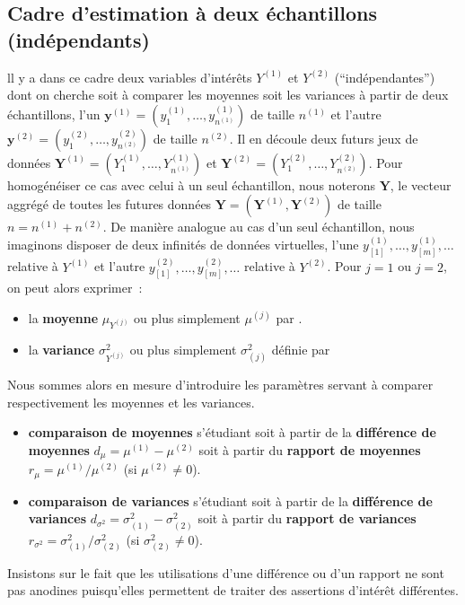 \documentclass[10pt]{article}
\begin{document}
\subsection{Cadre d'estimation {\`a} deux {\'e}chantillons (ind{\'e}pendants)}
ll y a dans ce cadre deux variables d'int{\'e}r{\^e}ts $Y^{(1)}$ et $Y^{(2)}$ (``ind{\'e}pendantes'') dont on cherche soit {\`a} comparer les moyennes soit les variances {\`a} partir de deux {\'e}chantillons, l'un $\mathbf{y}^{(1)}=(y_1^{(1)},\ldots,y_{n^{(1)}}^{(1)})$ de taille $n^{(1)}$ et  l'autre $\mathbf{y}^{(2)}=(y_1^{(2)},\ldots,y_{n^{(2)}}^{(2)})$ de taille $n^{(2)}$. Il en d{\'e}coule deux futurs jeux de donn{\'e}es  $\mathbf{Y}^{(1)}=(Y_1^{(1)},\ldots,Y_{n^{(1)}}^{(1)})$ et $\mathbf{Y}^{(2)}=(Y_1^{(2)},\ldots,Y_{n^{(2)}}^{(2)})$. Pour homog{\'e}n{\'e}iser ce cas avec celui {\`a} un seul {\'e}chantillon, nous noterons $\mathbf{Y}$, le vecteur aggr{\'e}g{\'e} de toutes les futures donn{\'e}es $\mathbf{Y}=(\mathbf{Y}^{(1)},\mathbf{Y}^{(2)})$ de taille $n=n^{(1)}+n^{(2)}$.
De mani{\`e}re analogue au cas d'un seul {\'e}chantillon, nous imaginons disposer de deux infinit{\'e}s de donn{\'e}es virtuelles, l'une $y_{[1]}^{(1)},\ldots,y_{[m]}^{(1)},\ldots$ relative {\`a} $Y^{(1)}$ et l'autre $y_{[1]}^{(2)},\ldots,y_{[m]}^{(2)},\ldots$ relative {\`a} $Y^{(2)}$. Pour $j=1$ ou $j=2$, on peut alors exprimer~:%
\begin{itemize}
  \item la \textbf{moyenne} $\mu_{Y^{(j)}}$ ou plus simplement $\mu^{(j)}$ par  .
  \item la \textbf{variance} $\sigma^2_{Y^{(j)}}$ ou plus simplement $\sigma_{(j)}^2$ d{\'e}finie par   
\end{itemize}

Nous sommes alors en mesure d'introduire les param{\`e}tres servant {\`a} comparer respectivement les moyennes et les variances.
\begin{itemize}
  \item \textbf{comparaison de moyennes} s'{\'e}tudiant soit {\`a} partir de la \textbf{diff{\'e}rence de moyennes} $d_\mu=\mu^{(1)}-\mu^{(2)}$ soit {\`a} partir du \textbf{rapport de moyennes} $r_\mu=\mu^{(1)}/\mu^{(2)}$ (si $\mu^{(2)} \neq 0$).
  \item \textbf{comparaison de variances} s'{\'e}tudiant soit {\`a} partir de la \textbf{diff{\'e}rence de variances} $d_{\sigma^2}=\sigma_{(1)}^2-\sigma_{(2)}^2$ soit {\`a} partir du \textbf{rapport de variances} $ r_{\sigma^2}=\sigma_{(1)}^2/\sigma_{(2)}^2$ (si $\sigma^2_{(2)} \neq 0$).
\end{itemize} 
Insistons sur le fait que les utilisations d'une diff{\'e}rence ou d'un rapport ne sont pas anodines puisqu'elles permettent de traiter des assertions d'int{\'e}r{\^e}t diff{\'e}rentes.
\end{document}
